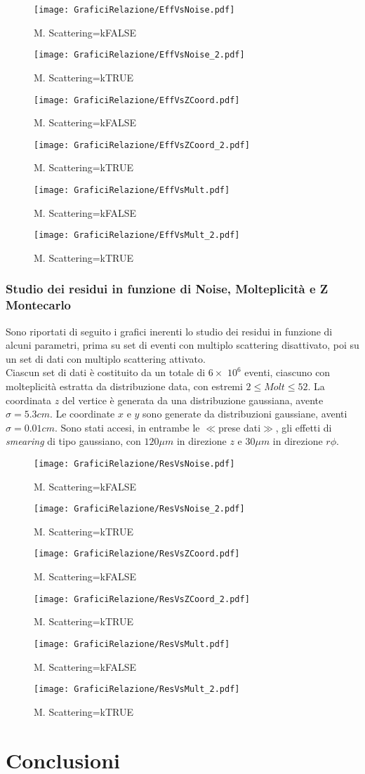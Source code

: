 \documentclass{article}
\begin{document}
\begin{figure}
\texttt{[image: GraficiRelazione/EffVsNoise.pdf]}
\caption{M. Scattering=kFALSE}
\texttt{[image: GraficiRelazione/EffVsNoise\_2.pdf]}
\caption{M. Scattering=kTRUE}
\end{figure}
\begin{figure}
\texttt{[image: GraficiRelazione/EffVsZCoord.pdf]}
\caption{M. Scattering=kFALSE}
\texttt{[image: GraficiRelazione/EffVsZCoord\_2.pdf]}
\caption{M. Scattering=kTRUE}
\end{figure}
\begin{figure}
\texttt{[image: GraficiRelazione/EffVsMult.pdf]}
\caption{M. Scattering=kFALSE}
\texttt{[image: GraficiRelazione/EffVsMult\_2.pdf]}
\caption{M. Scattering=kTRUE}
\end{figure}

\newpage
\subsubsection{Studio dei residui in funzione di Noise, Molteplicità e Z Montecarlo}
Sono riportati di seguito i grafici inerenti lo studio dei residui in funzione di alcuni parametri, prima su set di eventi con multiplo scattering disattivato, poi su un set di dati con multiplo scattering attivato.\\
\indent Ciascun set di dati è costituito da un totale di 
$6\times$ $10^{6}$ eventi, ciascuno con molteplicità estratta da distribuzione data, con estremi $2\leq Molt \leq 52$. La coordinata $z$ del vertice è generata da una distribuzione gaussiana, avente $\sigma=5.3cm$. Le coordinate $x$ e $y$ sono generate da distribuzioni gaussiane, aventi $\sigma=0.01cm$. Sono stati accesi, in entrambe le $\ll$prese dati$\gg$, gli effetti di \textit{smearing} di tipo gaussiano, con $120 \mu m$ in direzione  $z$ e $30 \mu m$ in direzione $r\phi$.

\begin{figure}
\texttt{[image: GraficiRelazione/ResVsNoise.pdf]}
\caption{M. Scattering=kFALSE}
\texttt{[image: GraficiRelazione/ResVsNoise\_2.pdf]}
\caption{M. Scattering=kTRUE}
\end{figure}
\begin{figure}
\texttt{[image: GraficiRelazione/ResVsZCoord.pdf]}
\caption{M. Scattering=kFALSE}
\texttt{[image: GraficiRelazione/ResVsZCoord\_2.pdf]}
\caption{M. Scattering=kTRUE}
\end{figure}
\begin{figure}
\texttt{[image: GraficiRelazione/ResVsMult.pdf]}
\caption{M. Scattering=kFALSE}
\texttt{[image: GraficiRelazione/ResVsMult\_2.pdf]}
\caption{M. Scattering=kTRUE}
\end{figure}
\newpage
\section{Conclusioni}
\end{document}
